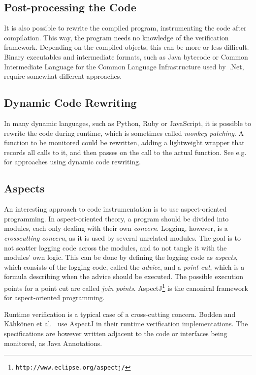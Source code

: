 \documentclass[a4paper,11pt]{kth-mag}
\theoremstyle{definition}
\begin{document}
\subsection{Post-processing the Code}

It is also possible to rewrite the compiled program, instrumenting the code
after compilation. This way, the program needs no knowledge of the verification
framework. Depending on the compiled objects, this can be more or less
difficult. Binary executables and intermediate formats, such as Java bytecode
or Common Intermediate Language for the Common Language Infrastructure used
by~.Net, require somewhat different approaches.


\subsection{Dynamic Code Rewriting}

In many dynamic languages, such as Python, Ruby or JavaScript, it is possible
to rewrite the code during runtime, which is sometimes called \textit{monkey
patching}. A function to be monitored could be rewritten, adding a lightweight
wrapper that records all calls to it, and then passes on the call to the actual
function. See e.g.\ \cite{matusiak09aoppy} for approaches using dynamic code
rewriting.


\subsection{Aspects} \label{section-aspects}

An interesting approach to code instrumentation is to use aspect-oriented
programming. In aspect-oriented theory, a program should be divided into
modules, each only dealing with their own \textit{concern}. Logging, however,
is a \textit{crosscutting concern}, as it is used by several unrelated modules.
The goal is to not scatter logging code across the modules, and to not tangle
it with the modules' own logic. This can be done by defining the logging code
as \textit{aspects}, which consists of the logging code, called the
\textit{advice}, and a \textit{point cut}, which is a formula describing when
the advice should be executed. The possible execution points for a point cut
are called \textit{join points}.
AspectJ\footnote{\texttt{http://www.eclipse.org/aspectj/}} is the canonical
framework for aspect-oriented programming.

Runtime verification is a typical case of a cross-cutting concern. Bodden
\cite{bodden05efficientrv} and Kähkönen et al.\ \cite{kahkonen09lime} use
AspectJ in their runtime verification implementations. The specifications are
however written adjacent to the code or interfaces being monitored, as Java
Annotations.
\end{document}
